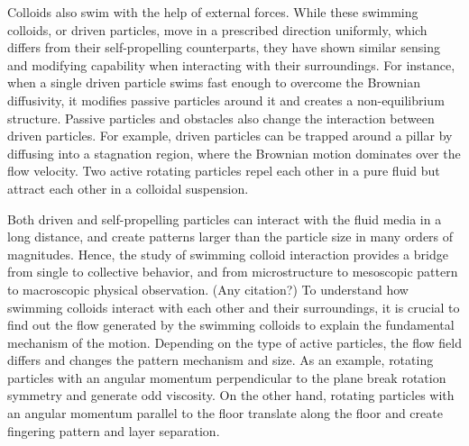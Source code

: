 \documentclass[12pt]{article}
\newcommand{\SYC}[1]{{\color{green} #1}}
\begin{document}
Colloids also swim with the help of external forces.\cite{zhang_characterizing_2009, driscoll_unstable_2017, delmotte_hydrodynamic_2017, alapan_multifunctional_2020} While these swimming colloids, or driven particles, move in a prescribed direction uniformly, which differs from their self-propelling counterparts, they have shown similar sensing and modifying capability when interacting with their surroundings.\cite{volpe_microswimmers_2011, tierno_recent_2014, yang_microwheels_2019, tsang_roads_2020, van_der_wee_simple_2023} 
For instance, when a single driven particle swims fast enough to overcome the Brownian diffusivity, it modifies passive particles around it and creates a non-equilibrium structure.\cite{burkholder_nonlinear_2020, knezevic_oscillatory_2021, rafael_active_2022}
%
Passive particles and obstacles also change the interaction between driven particles. 
For example, driven particles can be trapped around a pillar by diffusing into a stagnation region, where the Brownian motion dominates over the flow velocity.\cite{van_der_wee_simple_2023}
Two active rotating particles repel each other in a pure fluid but attract each other in a colloidal suspension.\cite{aragones_elasticity-induced_2016} 
  

Both driven and self-propelling particles can interact with the fluid media in a long distance, and create patterns larger than the particle size in many orders of magnitudes.\cite{huang_circular_2021, zhang_hyperuniform_2022} 
Hence, the study of swimming colloid interaction provides a bridge from single to collective behavior, and from microstructure to mesoscopic pattern to macroscopic physical observation. \SYC{(Any citation?)}
%
To understand how swimming colloids interact with each other and their surroundings, it is crucial to find out the flow generated by the swimming colloids to explain the fundamental mechanism of the motion.\cite{boniface_hydrodynamics_2023} Depending on the type of active particles, the flow field differs and changes the pattern mechanism and size. As an example, rotating particles with an angular momentum perpendicular to the plane break rotation symmetry and generate odd viscosity.\cite{fruchart_odd_2023} On the other hand, rotating particles with an angular momentum parallel to the floor translate along the floor and create fingering pattern and layer separation.\cite{driscoll_unstable_2017, sprinkle_driven_2020}

\end{document}
